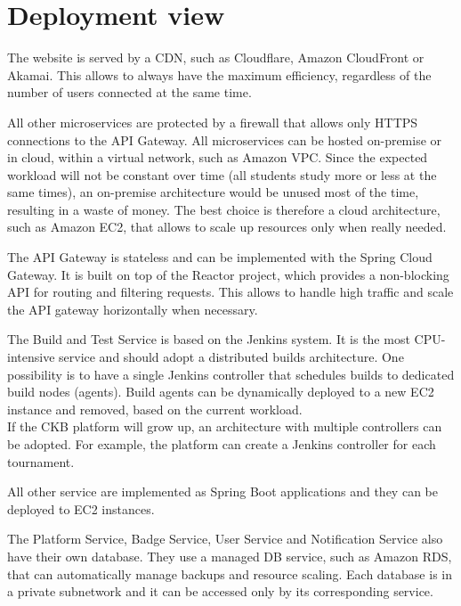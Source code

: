 \section{Deployment view}
\begin{adjustbox}{
        max size={\textwidth}{},
        caption={Deployment view diagram},
        label={fig:Deployment view diagram},
        figure=H}
    \centering
\end{adjustbox}

The website is served by a CDN, such as Cloudflare, Amazon CloudFront or Akamai.
This allows to always have the maximum efficiency, regardless of the number of users connected at the same time.

All other microservices are protected by a firewall that allows only HTTPS connections to the API Gateway.
All microservices can be hosted on-premise or in cloud, within a virtual network, such as Amazon VPC.
Since the expected workload will not be constant over time (all students study more or less at the same times),
an on-premise architecture would be unused most of the time, resulting in a waste of money.
The best choice is therefore a cloud architecture, such as Amazon EC2, that allows to scale up resources only when really needed.

The API Gateway is stateless and can be implemented with the Spring Cloud Gateway.
It is built on top of the Reactor project, which provides a non-blocking API for routing and filtering requests.
This allows to handle high traffic and scale the API gateway horizontally when necessary.

The Build and Test Service is based on the Jenkins system.
It is the most CPU-intensive service and should adopt a distributed builds architecture.
One possibility is to have a single Jenkins controller that schedules builds to dedicated build nodes (agents).
Build agents can be dynamically deployed to a new EC2 instance and removed, based on the current workload.\\
If the CKB platform will grow up, an architecture with multiple controllers can be adopted.
For example, the platform can create a Jenkins controller for each tournament.

All other service are implemented as Spring Boot applications and they can be deployed to EC2 instances.

The Platform Service, Badge Service, User Service and Notification Service also have their own database.
They use a managed DB service, such as Amazon RDS, that can automatically manage backups and resource scaling.
Each database is in a private subnetwork and it can be accessed only by its corresponding service.

